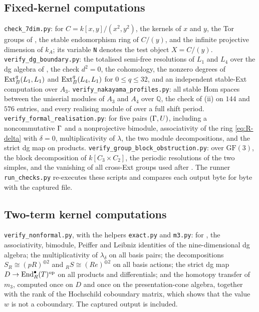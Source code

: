 \subsection*{Fixed-kernel computations}
\texttt{check\_7dim.py}: for \(C=k[x,y]/(x^2,y^2)\), the kernels of \(x\) and \(y\), the Tor groups of , the stable endomorphism ring of \(C/(y)\), and the infinite projective dimension of \(k_A\); its variable \texttt{N} denotes the test object \(X=C/(y)\).
\texttt{verify\_dg\_boundary.py}: the totalised semi-free resolutions of \(L_1\) and \(L_4\) over the dg algebra of , the check \(d^2=0\), the cohomology, the nonzero degrees of \(\operatorname{Ext}^q_B(L_1,L_1)\) and \(\operatorname{Ext}^q_B(L_4,L_1)\) for \(0\le q\le32\), and an independent stable-Ext computation over \(A_3\).
\texttt{verify\_nakayama\_profiles.py}: all stable Hom spaces between the uniserial modules of \(A_3\) and \(A_4\) over \(\mathbb Q\), the check of (ii) on \(144\) and \(576\) entries, and every realising module of  over a full shift period.
\texttt{verify\_formal\_realisation.py}: for five pairs \((\Gamma,U)\), including a noncommutative \(\Gamma\) and a nonprojective bimodule, associativity of the ring \eqref{eq:R-delta} with \(\delta=0\), multiplicativity of \(\lambda\), the two module decompositions, and the strict dg map on products.
\texttt{verify\_group\_block\_obstruction.py}: over \(\mathrm{GF}(3)\), the block decomposition of \(k[C_3\times C_2]\), the periodic resolutions of the two simples, and the vanishing of all cross-Ext groups used after .
The runner \texttt{run\_checks.py} re-executes these scripts and compares each output byte for byte with the captured file.

\subsection*{Two-term kernel computations}
\texttt{verify\_nonformal.py}, with the helpers \texttt{exact.py} and \texttt{m3.py}: for , the associativity, bimodule, Peiffer and Leibniz identities of the nine-dimensional dg algebra; the multiplicativity of \(\lambda_\delta\) on all basis pairs; the decompositions \(S_{R}\cong(pR)^{\oplus2}\) and \({}_RS\cong(Re)^{\oplus2}\) on all basis actions; the strict dg map \(D\to\operatorname{End}^\bullet_R(T)^{\mathrm{op}}\) on all products and differentials; and the homotopy transfer of \(m_3\), computed once on \(D\) and once on the presentation-cone algebra, together with the rank of the Hochschild coboundary matrix, which shows that the value \(w\) is not a coboundary.  The captured output is included.



